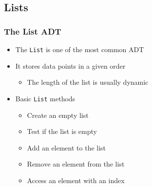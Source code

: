 \documentclass[11pt]{beamer}
\begin{document}
\subsection{Lists}

\begin{frame}\frametitle{The List ADT}
\begin{itemize}
\item The \texttt{List} is one of the most common ADT
\item It stores data points in a given order
    \begin{itemize}
    \item The length of the list is usually dynamic
    \end{itemize}
\item Basic \texttt{List} methods
    \begin{itemize}
    \item Create an empty list
    \item Test if the list is empty
    \item Add an element to the list
    \item Remove an element from the list
    \item Access an element with an index
    \end{itemize}
\end{itemize}
\vspace{0.4cm}
\begin{center}
\end{center}
\end{frame}
\end{document}
